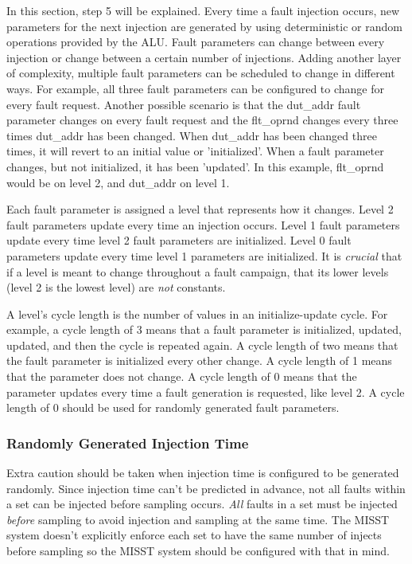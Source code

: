 \documentclass[]{report}
\begin{document}
In this section, step 5 will be explained. Every time a fault injection occurs, new parameters for the next injection are generated by using deterministic or random operations provided by the ALU. Fault parameters can change between every injection or change between a certain number of injections. Adding another layer of complexity, multiple fault parameters can be scheduled to change in different ways. For example, all three fault parameters can be configured to change for every fault request. Another possible scenario is that the dut\_addr fault parameter changes on every fault request and the flt\_oprnd changes every three times dut\_addr has been changed. When dut\_addr has been changed three times, it will revert to an initial value or 'initialized'. When a fault parameter changes, but not initialized, it has been 'updated'. In this example, flt\_oprnd would be on level 2, and dut\_addr on level 1.

Each fault parameter is assigned a level that represents how it changes. Level 2 fault parameters update every time an injection occurs. Level 1 fault parameters update every time level 2 fault parameters are initialized. Level 0 fault parameters update every time level 1 parameters are initialized. It is \textit{crucial} that if a level is meant to change throughout a fault campaign, that its lower levels (level 2 is the lowest level) are \textit{not} constants. 

A level's cycle length is the number of values in an initialize-update cycle. For example, a cycle length of 3 means that a fault parameter is initialized, updated, updated, and then the cycle is repeated again. A cycle length of two means that the fault parameter is initialized every other change. A cycle length of 1 means that the parameter does not change. A cycle length of 0 means that the parameter updates every time a fault generation is requested, like level 2. A cycle length of 0 should be used for randomly generated fault parameters.

\subsubsection{Randomly Generated Injection Time}
\label{ss rand gen inj time}

Extra caution should be taken when injection time is configured to be generated randomly. Since injection time can't be predicted in advance, not all faults within a set can be injected before sampling occurs. \textit{All} faults in a set must be injected \textit{before} sampling to avoid injection and sampling at the same time. The MISST system doesn't explicitly enforce each set to have the same number of injects before sampling so the MISST system should be configured with that in mind. 
\end{document}
